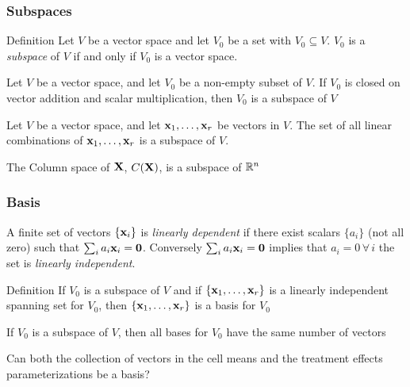 \documentclass[handout]{beamer}
\begin{document}
\begin{frame}
  \frametitle{Subspaces}
  \begin{block}{Definition}
    Let $V$ be a vector space and let $V_0$ be a set with $V_0
    \subseteq V$.  $V_0$ is a {\it subspace} of $V$ if and only if
    $V_0$ is a vector space.
  \end{block} \pause

  \begin{theorem}
    Let $V$ be a vector space, and let $V_0$ be a non-empty subset of
    $V$.  If $V_0$ is closed on vector addition and scalar
    multiplication, then $V_0$ is a subspace of $V$
  \end{theorem}  \pause

  \begin{theorem}
    Let $V$ be a vector space, and let $\mathbf{x}_1, \ldots, \mathbf{x}_r$ be vectors
    in    $V$.  The set of all linear combinations of $\mathbf{x}_1, \ldots, \mathbf{x}_r$
    is a subspace of $V$.  \pause
  \end{theorem}
The Column space of $\mathbf{X}$, $C(\mathbf{X})$, is a subspace of $\mathbb{R}^n$
\end{frame}
\begin{frame}
  \frametitle{Basis}
  \begin{definition}
    A finite set of vectors $\{\mathbf{x}_i\}$ is {\it linearly dependent }
      if there exist scalars $\{a_i \}$ (not all zero) such that 
 $\sum_i    a_i \mathbf{x}_i = \mathbf{0}$.
\pause  Conversely  $\sum_i
        a_i \mathbf{x}_i = \mathbf{0}$ implies that $a_i = 0 \, \forall \,  i$ the set is
        {\it linearly independent}.
  \end{definition} \pause

  \begin{block}{Definition}
    If $V_0$ is a subspace of $V$ and if $\{\mathbf{x}_1, \ldots, \mathbf{x}_r \}$ is a
    linearly independent spanning set for $V_0$, then $\{\mathbf{x}_1, \ldots,
    \mathbf{x}_r \}$  is a basis for $V_0$
  \end{block} \pause

  \begin{theorem}
    If $V_0$ is a subspace of $V$, then all bases for $V_0$ have the
    same number of vectors
  \end{theorem} \pause
Can both the collection of vectors in the cell means 
and the treatment effects parameterizations be a basis?
\end{frame}
\end{document}
